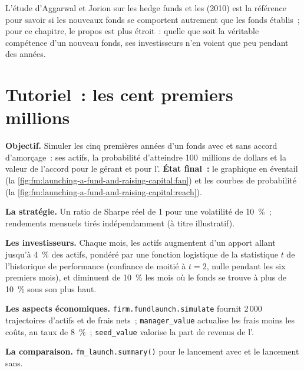 L'étude d'Aggarwal et Jorion sur les hedge funds et les  (2010) est la référence pour savoir si les nouveaux fonds se comportent autrement que les
fonds établis~; pour ce chapitre, le propos est plus étroit~: quelle que soit la véritable compétence d'un nouveau fonds, ses investisseurs n'en voient que peu pendant des années.

\section{Tutoriel~: les cent premiers millions}\label{tut:fm:launching-a-fund-and-raising-capital:tut}

\begin{tutorial}
\textbf{Objectif.} Simuler les cinq premières années d'un fonds avec et sans accord d'amorçage~: ses actifs, la probabilité d'atteindre 100~millions de dollars et la valeur
de l'accord pour le gérant et pour l'. \textbf{État final~:} le graphique en éventail (la \cref{fig:fm:launching-a-fund-and-raising-capital:fan}) et les
courbes de probabilité (la \cref{fig:fm:launching-a-fund-and-raising-capital:reach}).
\begin{tutsteps}
\item \textbf{La stratégie.} Un ratio de Sharpe réel de 1 pour une volatilité de 10~\%~; rendements mensuels tirés indépendamment (à titre illustratif).
\item \textbf{Les investisseurs.} Chaque mois, les actifs augmentent d'un apport allant jusqu'à 4~\% des actifs, pondéré par une fonction logistique de la statistique
$t$ de l'historique de performance (confiance de moitié à $t=2$, nulle pendant les six premiers mois), et diminuent de 10~\% les mois où le fonds se trouve à plus de 10~\% sous son plus haut.
\item \textbf{Les aspects économiques.} \texttt{firm.fundlaunch.simulate} fournit 2\,000 trajectoires d'actifs et de frais nets~; \texttt{manager\_value} actualise les frais
moins les coûts, au taux de 8~\%~; \texttt{seed\_value} valorise la part de revenus de l'.
\item \textbf{La comparaison.} \texttt{fm\_launch.summary()} pour le lancement avec  et le lancement sans.
\end{tutsteps}
\end{tutorial}

